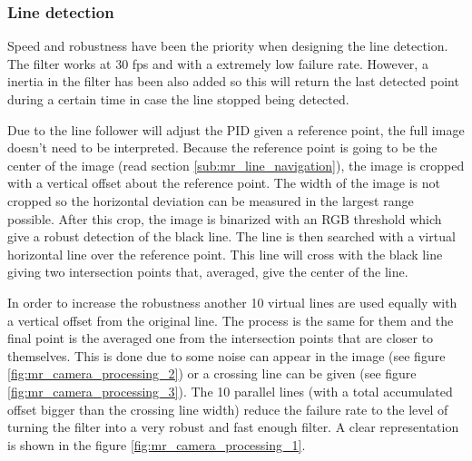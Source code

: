	\subsubsection{Line detection} %
	\label{ssub:line_detection}
	Speed and robustness have been the priority when designing the line detection.
	The filter works at 30 fps and with a extremely low failure rate.
	However, a inertia in the filter has been also added so this will return the last detected point during a certain time in case the line stopped being detected.

	Due to the line follower will adjust the PID given a reference point, the full image doesn't need to be interpreted.
	Because the reference point is going to be the center of the image (read section \ref{sub:mr_line_navigation}), the image is cropped with a vertical offset about the reference point.
	The width of the image is not cropped so the horizontal deviation can be measured in the largest range possible.
	After this crop, the image is binarized with an RGB threshold which give a robust detection of the black line.
	The line is then searched with a virtual horizontal line over the reference point.
	This line will cross with the black line giving two intersection points that, averaged, give the center of the line.

	In order to increase the robustness another 10 virtual lines are used equally with a vertical offset from the original line.
	The process is the same for them and the final point is the averaged one from the intersection points that are closer to themselves.
	This is done due to some noise can appear in the image (see figure \ref{fig:mr_camera_processing_2}) or a crossing line can be given (see figure \ref{fig:mr_camera_processing_3}).
	The 10 parallel lines (with a total accumulated offset bigger than the crossing line width) reduce the failure rate to the level of turning the filter into a very robust and fast enough filter.
	A clear representation is shown in the figure \ref{fig:mr_camera_processing_1}.

